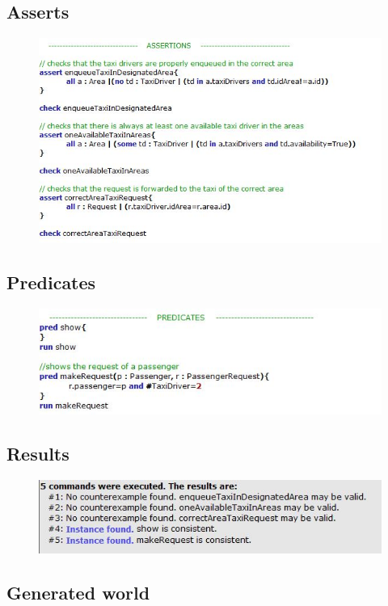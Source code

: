 \documentclass[18pt,oneside,a4paper, titlepage]{article}
\begin{document}
	\subsection{Asserts}
	\begin{figure}[h]
		\includegraphics[scale=0.8]{assertions.jpg}
	\end{figure}
	\subsection{Predicates}
		\begin{figure}[h]
			\includegraphics[scale=0.8]{predicates.jpg}
		\end{figure}
	\subsection{Results}
		\begin{figure}[h]
			\includegraphics[scale=1]{results.jpg}
		\end{figure}
\newpage
	\subsection{Generated world}
\end{document}
